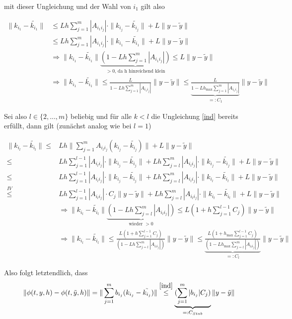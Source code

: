 \begin{solution}
mit dieser Ungleichung und der Wahl von $i_{1}$ gilt also

\begin{align*}
  \|k_{i_{1}}-\tilde{k_{i_{1}}}\| &\leq Lh \sum_{j=1}^{m}|A_{i_{1}i_{j}}|\cdot\|k_{i_{j}}-\tilde{k_{i_{j}}}\| + L\|y-\tilde{y}\| \\
  &\leq Lh\sum_{j=1}^{m}|A_{i_{1}i_{j}}| \cdot \|k_{i_{1}}-\tilde{k_{i_{1}}}\| + L\|y-\tilde{y}\| \\
  &\Rightarrow  \|k_{i_{1}}-\tilde{k_{i_{1}}}\| \underbrace{(1-Lh\sum_{j=1}^{m}|A_{i_{1}i_{j}}|)}_{>0 \text{,~da h hinreichend klein}} \leq L\|y-\tilde{y}\| \\
  &\Rightarrow  \|k_{i_{1}}-\tilde{k_{i_{1}}}\|  \leq \frac{L}{1-Lh\sum_{j=1}^{m}|A_{i_{1}i_{j}}|}\|y-\tilde{y}\| \leq  \underbrace{\frac{L}{1-Lh_{\max}\sum_{j=1}^{m}|A_{i_{1}i_{j}}|}}_{=:C_{1}} \|y-\tilde{y}\|
\end{align*}

Sei also $l \in \{2,...,m\}$ beliebig und für alle $k<l$ die Ungleichung \eqref{ind} bereits erfüllt, dann gilt (zunächst analog wie bei $l=1$)

\begin{align*}
  \|k_{i_{l}}-\tilde{k_{i_{l}}}\| \leq& Lh \|\sum_{j=1}^{m}A_{i_{l}i_{j}}(k_{i_{j}}-\tilde{k_{i_{j}}})\| + L\|y-\tilde{y}\| \\
  \leq& Lh\sum_{j=1}^{l-1}|A_{i_{l}i_{j}}|\cdot\|k_{i_{j}}-\tilde{k_{i_{j}}}\| + Lh\sum_{j=l}^{m}|A_{i_{l}i_{j}}|\cdot\|k_{i_{j}}-\tilde{k_{i_{j}}}\| + L\|y-\tilde{y}\| \\
  \stackrel{}{\leq}& Lh\sum_{j=1}^{l-1}|A_{i_{l}i_{j}}|\cdot\|k_{i_{j}}-\tilde{k_{i_{j}}}\| + Lh\sum_{j=l}^{m}|A_{i_{l}i_{j}}| \cdot \|k_{i_{l}}-\tilde{k_{i_{l}}}\|+ L\|y-\tilde{y}\| \\
  \stackrel{IV}{\leq}& Lh\sum_{j=1}^{l-1}|A_{i_{l}i_{j}}|\cdot C_{j} \|y-\tilde{y}\| + Lh\sum_{j=l}^{m}|A_{i_{l}i_{j}}| \cdot \|k_{i_{l}}-\tilde{k_{i_{l}}}\|+ L\|y-\tilde{y}\| \\
  &\Rightarrow  \|k_{i_{l}}-\tilde{k_{i_{l}}}\| \underbrace{(1-Lh\sum_{j=l}^{m}|A_{i_{l}i_{j}}|)}_{\text{wieder~} >0} \leq L(1+h\sum_{j=1}^{l-1}C_{j}) \|y-\tilde{y}\| \\
  &\Rightarrow  \|k_{i_{l}}-\tilde{k_{i_{l}}}\| \leq \frac{L(1+h\sum_{j=1}^{l-1}C_{j})}{(1-Lh\sum_{j=l}^{m}|A_{i_{l}i_{j}}|)}\|y-\tilde{y}\| \leq \underbrace{\frac{L(1+h_{\max}\sum_{j=1}^{l-1}C_{j})}{(1-Lh_{\max}\sum_{j=l}^{m}|A_{i_{l}i_{j}}|)}}_{=:C_{l}} \|y-\tilde{y}\|
\end{align*}

Also folgt letztendlich, dass
\begin{align*}
  \|\phi(t,y,h) - \phi(t,\tilde{y},h)\| = \|\sum_{j=1}^{m}b_{i_{j}}(k_{i_{j}}-\tilde{k_{i_{j}}})\| \stackrel{ \eqref{ind}}{\leq} \underbrace{(\sum_{j=1}^{m}|b_{i_{j}}|C_{j})}_{=:C_{Stab}} \|y-\tilde{y}\|
\end{align*}
\end{solution}
